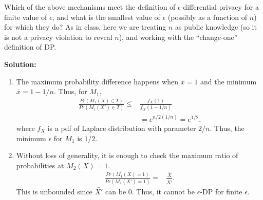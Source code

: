 \documentclass[12pt]{article}
\begin{document}
\begin{enumerate}
\begin{enumerate}[(M1)]
    \end{enumerate}
        Which of the above mechanisms meet the definition of $\epsilon$-differential privacy for a finite value of $\epsilon$, and what is the smallest value of $\epsilon$ (possibly as a function of $n$) for which they do? \label{part:epsilon}
        As in class, here we are treating $n$ as public knowledge (so it is not a privacy violation to reveal $n$), and working with the ``change-one'' definition of DP.

\begin{solution}
{\bf Solution:}\\
\begin{enumerate}
    \item 
The maximum probability difference happens when $\bar{x}=1$ and the minimum $\bar{x}=1-1/n$.
Thus, for $M_1$,
\begin{align*}
    \frac{Pr(M_1(X)\in T)}{Pr(M_1(X')\in T)} 
    \leq& \frac{f_X(1)}{f_X(1-1/n)}\\ 
    &= e^{n/2 (1/n)} = e^{1/2}.
\end{align*}
where $f_X$ is a pdf of Laplace distribution with parameter $2/n$.
Thus, the minimum $\epsilon$ for $M_1$ is $1/2$.

\item Without loss of generality, it is enough to check the maximum ratio of probabilities at $M_2(X)=1$.
\begin{align*}
    \frac{Pr(M_1(X)=1)}{Pr(M_1(X')=1)} 
    =& \frac{\bar{X}}{\bar{X'}}.
\end{align*}
This is unbounded since $\bar{X'}$ can be 0.
Thus, it cannot be $\epsilon$-DP for finite $\epsilon$.
\end{enumerate}
\end{solution}


\end{enumerate}
\end{document}
